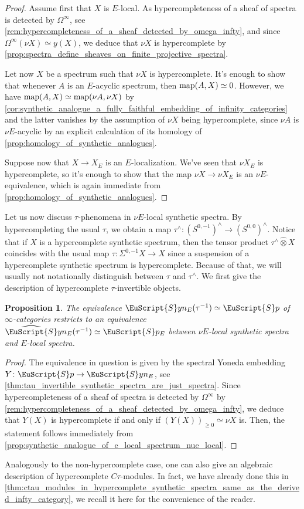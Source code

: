 \documentclass[oneside,a4paper]{amsart}
\newcommand{\euscr}[1]{\EuScript{#1}} %
\newcommand{\map}{\textnormal{map}} %
\newcommand{\spectra}{\euscr{S}p} %
\newcommand{\synspectra}{\euscr{S}yn} %
\newcommand{\hpsynspectra}{\widehat{\euscr{S}}yn} %
\newcommand{\omegainfty}{\Omega^{\infty}} %
\theoremstyle{plain}
\newtheorem{prop}[thm]{Proposition}
\theoremstyle{definition}
\theoremstyle{remark}
\begin{document}
\begin{proof}
Assume first that $X$ is $E$-local. As hypercompleteness of a sheaf of spectra is detected by $\omegainfty$, see \cref{rem:hypercompleteness_of_a_sheaf_detected_by_omega_infty}, and since $\omegainfty (\nu X) \simeq y(X)$, we deduce that $\nu X$ is hypercomplete by \cref{prop:spectra_define_sheaves_on_finite_projective_spectra}. 

Let now $X$ be a spectrum such that $\nu X$ is hypercomplete. It's enough to show that whenever $A$ is an $E$-acyclic spectrum, then $\map(A, X) \simeq 0$. However, we have $\map(A, X) \simeq \map(\nu A, \nu X)$ by \cref{cor:synthetic_analogue_a_fully_faithful_embedding_of_infinity_categories} and the latter vanishes by the assumption of $\nu X$ being hypercomplete, since $\nu A$ is $\nu E$-acyclic by an explicit calculation of its homology of \cref{prop:homology_of_synthetic_analogues}.

Suppose now that $X \rightarrow X_{E}$ is an $E$-localization. We've seen that $\nu X_{E}$ is hypercomplete, so it's enough to show that the map $\nu X \rightarrow \nu X_{E}$ is an $\nu E$-equivalence, which is again immediate from \cref{prop:homology_of_synthetic_analogues}.
\end{proof}

Let us now discuss $\tau$-phenomena in $\nu E$-local synthetic spectra. By hypercompleting the usual $\tau$, we obtain a map $\tau^{\wedge} \colon (S^{0, -1})^{\wedge} \rightarrow (S^{0, 0})^{\wedge}$. Notice that if $X$ is a hypercomplete synthetic spectrum, then the tensor product $\tau^{\wedge} \widehat{\otimes} X$ coincides with the usual map $\tau \colon \Sigma^{0, -1} X \rightarrow X$ since a suspension of a hypercomplete synthetic spectrum is hypercomplete. Because of that, we will usually not notationally distinguish between $\tau$ and $\tau^{\wedge}$. We first give the description of hypercomplete $\tau$-invertible objects. 

\begin{prop}
The equivalence $\synspectra_{E}(\tau^{-1}) \simeq \spectra$ of $\infty$-categories restricts to an equivalence $\hpsynspectra_{E}(\tau^{-1}) \simeq \spectra_{E}$ between $\nu E$-local synthetic spectra and $E$-local spectra. 
\end{prop}

\begin{proof}
The equivalence in question is given by the spectral Yoneda embedding $Y \colon \spectra \rightarrow \synspectra_{E}$, see \cref{thm:tau_invertible_synthetic_spectra_are_just_spectra}. Since hypercompleteness of a sheaf of spectra is detected by $\omegainfty$ by \cref{rem:hypercompleteness_of_a_sheaf_detected_by_omega_infty}, we deduce that $Y(X)$ is hypercomplete if and only if $(Y(X))_{\geq 0} \simeq \nu X$ is. Then, the statement follows immediately from \cref{prop:synthetic_analogue_of_e_local_spectrum_nue_local}. 
\end{proof}
Analogously to the non-hypercomplete case, one can also give an algebraic description of hypercomplete $C\tau$-modules. In fact, we have already done this in \cref{thm:ctau_modules_in_hypercomplete_synthetic_spectra_same_as_the_derived_infty_category}, we recall it here for the convenience of the reader.
\end{document}
